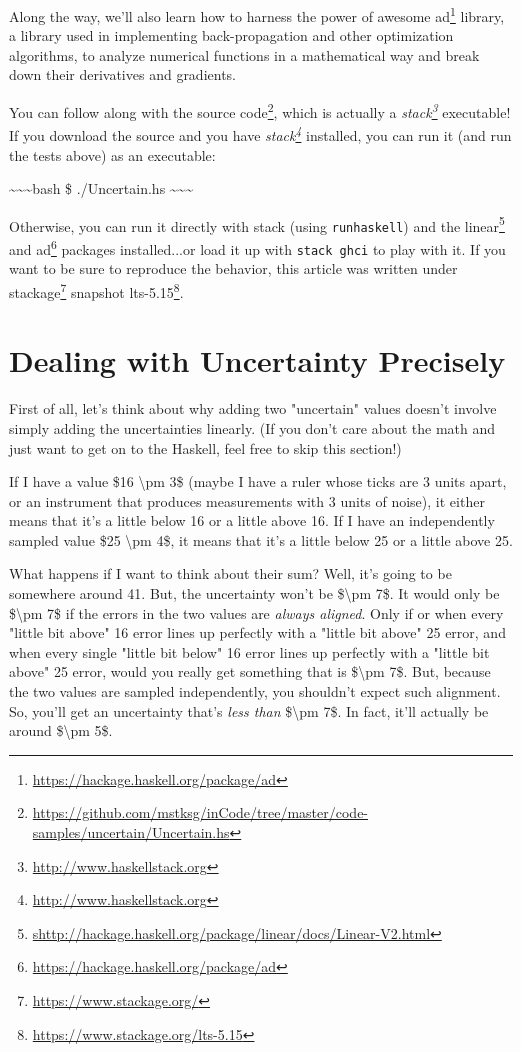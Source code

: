 \documentclass[]{article}
\renewcommand{\href}[2]{#2\footnote{\url{#1}}}
\begin{document}
Along the way, we'll also learn how to harness the power of awesome
\href{https://hackage.haskell.org/package/ad}{ad} library, a library used in
implementing back-propagation and other optimization algorithms, to analyze
numerical functions in a mathematical way and break down their derivatives and
gradients.

You can follow along with
\href{https://github.com/mstksg/inCode/tree/master/code-samples/uncertain/Uncertain.hs}{the
source code}, which is actually a
\emph{\href{http://www.haskellstack.org}{stack}} executable! If you download the
source and you have \emph{\href{http://www.haskellstack.org}{stack}} installed,
you can run it (and run the tests above) as an executable:

\textasciitilde{}\textasciitilde{}\textasciitilde{}bash \$ ./Uncertain.hs
\textasciitilde{}\textasciitilde{}\textasciitilde{}

Otherwise, you can run it directly with stack (using \texttt{runhaskell}) and
the
\href{shttp://hackage.haskell.org/package/linear/docs/Linear-V2.html}{linear}
and \href{https://hackage.haskell.org/package/ad}{ad} packages installed...or
load it up with \texttt{stack\ ghci} to play with it. If you want to be sure to
reproduce the behavior, this article was written under
\href{https://www.stackage.org/}{stackage} snapshot
\href{https://www.stackage.org/lts-5.15}{lts-5.15}.

\section{Dealing with Uncertainty Precisely}

First of all, let's think about why adding two "uncertain" values doesn't
involve simply adding the uncertainties linearly. (If you don't care about the
math and just want to get on to the Haskell, feel free to skip this section!)

If I have a value \$16 \textbackslash{}pm 3\$ (maybe I have a ruler whose ticks
are 3 units apart, or an instrument that produces measurements with 3 units of
noise), it either means that it's a little below 16 or a little above 16. If I
have an independently sampled value \$25 \textbackslash{}pm 4\$, it means that
it's a little below 25 or a little above 25.

What happens if I want to think about their sum? Well, it's going to be
somewhere around 41. But, the uncertainty won't be \$\textbackslash{}pm 7\$. It
would only be \$\textbackslash{}pm 7\$ if the errors in the two values are
\emph{always aligned}. Only if or when every "little bit above" 16 error lines
up perfectly with a "little bit above" 25 error, and when every single "little
bit below" 16 error lines up perfectly with a "little bit above" 25 error, would
you really get something that is \$\textbackslash{}pm 7\$. But, because the two
values are sampled independently, you shouldn't expect such alignment. So,
you'll get an uncertainty that's \emph{less than} \$\textbackslash{}pm 7\$. In
fact, it'll actually be around \$\textbackslash{}pm 5\$.
\end{document}
